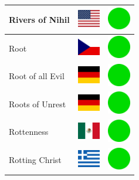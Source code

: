 \documentclass[12pt, a4paper, twoside]{report}
\begin{document}
\begin{center}
\begin{longtable}{|p{5cm}|p{2cm}|p{2cm}|}
 Rivers of Nihil                                            & \includegraphics[width=1cm]{../img/flags/us} &   \includegraphics[width=1cm]{../likes/y} \\ \hline
 Root                                                       & \includegraphics[width=1cm]{../img/flags/cz} &   \includegraphics[width=1cm]{../likes/y} \\ \hline
 Root of all Evil                                           & \includegraphics[width=1cm]{../img/flags/de} &   \includegraphics[width=1cm]{../likes/y} \\ \hline
 Roots of Unrest                                            & \includegraphics[width=1cm]{../img/flags/de} &   \includegraphics[width=1cm]{../likes/y} \\ \hline
 Rottenness                                                 & \includegraphics[width=1cm]{../img/flags/mx} &   \includegraphics[width=1cm]{../likes/y} \\ \hline
 Rotting Christ                                             & \includegraphics[width=1cm]{../img/flags/gr} &   \includegraphics[width=1cm]{../likes/y} \\ \hline

\end{longtable}
\end{center}
\end{document}
